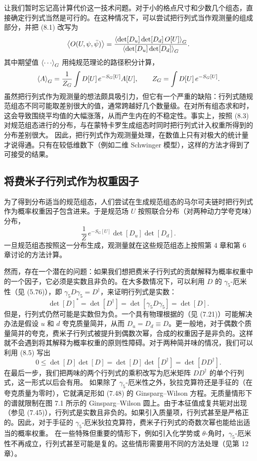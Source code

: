 让我们暂时忘记高计算代价这一技术问题。对于小的格点尺寸和少数几个组态，直接确定行列式当然是可行的。在这种情况下，可以尝试把行列式当作观测量的组成部分，并把 (8.1) 改写为
\begin{equation}
\left\langle O(U,\psi,\bar{\psi}) \right\rangle = \frac{\left\langle \det[D_u]\det[D_d]\,O[U] \right\rangle_G}{\left\langle \det[D_u]\det[D_d] \right\rangle_G}.
\end{equation}
其中期望值 $\ev{\cdots}_G$ 用纯规范理论的路径积分计算，
\begin{equation}
\left\langle A \right\rangle_G = \frac{1}{Z_G}\int D[U]\,e^{-S_G[U]}A[U], \qquad
Z_G = \int D[U]\,e^{-S_G[U]}.
\end{equation}
虽然把行列式作为观测量的想法颇具吸引力，但它有一个严重的缺陷：行列式随规范组态不同可能取差别很大的值，通常跨越好几个数量级。在对所有组态求和时，这会导致围绕平均值的大幅涨落，从而产生内在的不稳定性。事实上，按照 (8.3) 对规范组态进行的分布，与在蒙特卡罗生成组态时同时把行列式计入权重所得到的分布差别很大。
因此，把行列式作为观测量处理，在数值上只有对极大的统计量才说得通。只有在较低维数下（例如二维 Schwinger 模型），这样的方法才得到了可接受的结果。

\subsection{将费米子行列式作为权重因子}

为了得到分布适当的规范组态，人们尝试在生成规范组态的马尔可夫链时把行列式作为概率权重因子包含进来。于是规范场 $U$ 按照联合分布（对两种动力学夸克味）分布，
\begin{equation}
\frac{1}{Z}\,e^{-S_G[U]}\det[D_u]\det[D_d].
\end{equation}
一旦规范组态按照这一分布生成，观测量就在这些规范组态上按照第 4 章和第 6 章讨论的方法计算。

然而，存在一个潜在的问题：如果我们想把费米子行列式的贡献解释为概率权重中的一个因子，它必须是实数且非负的。在大多数情况下，可以利用 $D$ 的 $\gamma_5$-厄米性（见 (5.76)），即 $\gamma_5 D \gamma_5 = D^\dagger$，来证明行列式是实数：
\begin{equation}
\det[D]^* = \det[D^\dagger] = \det[\gamma_5 D\gamma_5] = \det[D].
\end{equation}
但是，行列式仍然可能是实数但为负。一个具有物理根据的（见 (7.21)）可能解决办法是假设 $u$ 和 $d$ 夸克质量简并，从而 $D_u = D_d \equiv D$。更一般地，对于偶数个质量简并的夸克，费米子行列式被提升到偶数次幂，合成的权重因子是非负的。这样就不会遇到将其解释为概率权重的原则性障碍。对于两种简并味的情况，我们可以利用 (8.5) 写出
\begin{equation}
0 \le \det[D]\det[D] = \det[D]\det[D^\dagger] = \det[DD^\dagger].
\end{equation}
在最后一步，我们把两味的两个行列式的乘积改写为厄米矩阵 $DD^\dagger$ 的单个行列式，这一形式以后会有用。
如果除了 $\gamma_5$-厄米性之外，狄拉克算符还是手征的（在夸克质量为零时），它就满足形如 (7.48) 的 Ginsparg--Wilson 方程。无质量情形下的谱就限制在图 7.1 所示的 Ginsparg--Wilson 圆上。由于本征值成复共轭对出现（参见 (7.45)），行列式是实数且非负的。如果引入质量项，行列式甚至是严格正的。因此，对于手征的 $\gamma_5$-厄米狄拉克算符，费米子行列式的奇数次幂也能给出适当的概率权重。
在一些特殊但重要的情形下，例如引入化学势或 $\theta$-角时，$\gamma_5$-厄米性不再成立，行列式甚至可能是复的。这些情形需要用不同的方法处理（见第 12 章）。

